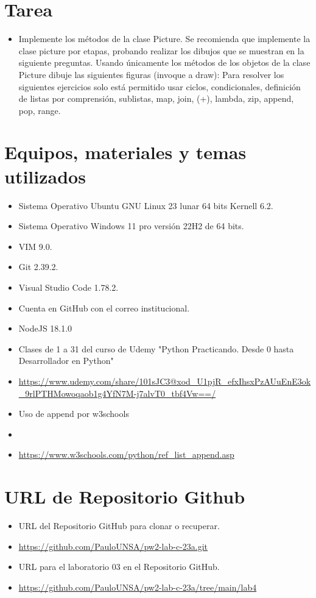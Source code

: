 \documentclass{article}
\begin{document}
	\section{Tarea}
	\begin{itemize}		
		\item  Implemente los métodos de la clase Picture. Se recomienda que implemente la clase picture
		por etapas, probando realizar los dibujos que se muestran en la siguiente preguntas.
		\subitem Usando  únicamente los métodos de los objetos de la clase Picture dibuje las siguientes
		figuras (invoque a draw):
		\subitem Para resolver los siguientes ejercicios solo está permitido usar ciclos, condicionales, definición
		de listas por comprensión, sublistas, map, join, (+), lambda, zip, append, pop, range.
	\end{itemize}
		
	\section{Equipos, materiales y temas utilizados}
	\begin{itemize}
		\item Sistema Operativo Ubuntu GNU Linux 23 lunar 64 bits Kernell 6.2.
		\item Sistema Operativo Windows 11 pro versión 22H2 de 64 bits.
		\item VIM 9.0.
		\item Git 2.39.2.
		\item Visual Studio Code 1.78.2.
		\item Cuenta en GitHub con el correo institucional.
		\item NodeJS 18.1.0
		\item Clases de 1 a 31 del curso de Udemy "Python Practicando. Desde 0 hasta Desarrollador en Python"
		\item \url{https://www.udemy.com/share/101sJC3@xod_U1pjR_efxIhsxPzAUuEnE3ok_9rlPTHMowoqaob1g4YfN7M-j7alvT0_tbf4Vw==/}
		\item Uso de append por w3schools
		\item \item \url{https://www.w3schools.com/python/ref_list_append.asp}
	\end{itemize}
	
	\section{URL de Repositorio Github}
	\begin{itemize}
		\item URL del Repositorio GitHub para clonar o recuperar.
		\item \url{https://github.com/PauloUNSA/pw2-lab-c-23a.git}
		\item URL para el laboratorio 03 en el Repositorio GitHub.
		\item \url{https://github.com/PauloUNSA/pw2-lab-c-23a/tree/main/lab4}
	\end{itemize}
	
\end{document}

